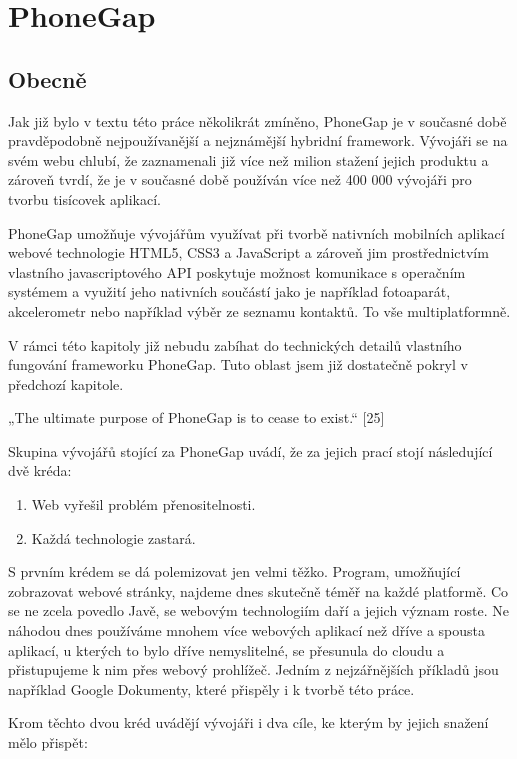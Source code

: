 \section{PhoneGap}
\subsection{Obecně}
Jak již bylo v textu\cite{what_is_app} této práce několikrát zmíněno, PhoneGap je v současné době pravděpodobně nejpoužívanější a nejznámější hybridní framework. Vývojáři se na svém webu chlubí, že zaznamenali již více než milion stažení jejich produktu a zároveň tvrdí, že je v současné době používán více než 400 000 vývojáři pro tvorbu tisícovek aplikací.

PhoneGap umožňuje vývojářům využívat při tvorbě nativních mobilních aplikací webové technologie HTML5, CSS3 a JavaScript a zároveň jim prostřednictvím vlastního javascriptového API poskytuje možnost komunikace s operačním systémem a využití jeho nativních součástí jako je například fotoaparát, akcelerometr nebo například výběr ze seznamu kontaktů. To vše multiplatformně.

V rámci této kapitoly již nebudu zabíhat do technických detailů vlastního fungování frameworku PhoneGap. Tuto oblast jsem již dostatečně pokryl v předchozí kapitole.

„The ultimate purpose of PhoneGap is to cease to exist.“ [25]

Skupina vývojářů stojící za PhoneGap uvádí, že za jejich prací stojí následující dvě kréda:

\begin{enumerate}
  \item Web vyřešil problém přenositelnosti.
  \item Každá technologie zastará.
\end{enumerate}

S prvním krédem se dá polemizovat jen velmi těžko. Program, umožňující zobrazovat webové stránky, najdeme dnes skutečně téměř na každé platformě. Co se ne zcela povedlo Javě, se webovým technologiím daří a jejich význam roste. Ne náhodou dnes používáme mnohem více webových aplikací než dříve a spousta aplikací, u kterých to bylo dříve nemyslitelné, se přesunula do cloudu a přistupujeme k nim přes webový prohlížeč. Jedním z nejzářnějších příkladů jsou například Google Dokumenty, které přispěly i k tvorbě této práce.

Krom těchto dvou kréd uvádějí vývojáři i dva cíle, ke kterým by jejich snažení mělo přispět:

